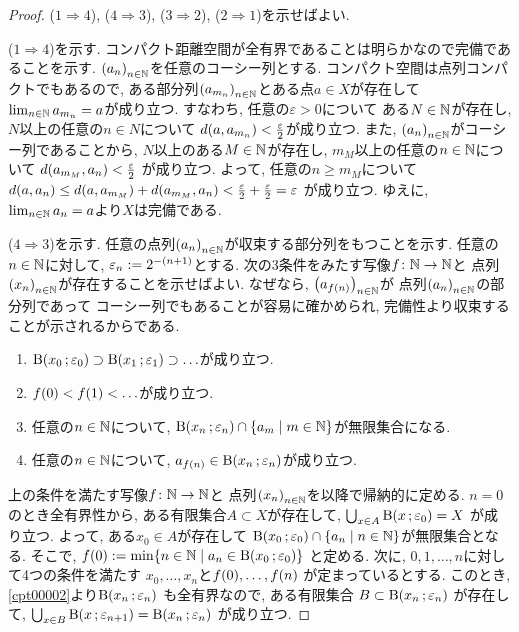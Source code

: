 \documentclass[uplatex, dvipdfmx, a4paper, 12pt, class=jsbook, crop=false]{standalone}
\begin{document}
\begin{proof}
	(\(1 \Longrightarrow 4\)), (\(4 \Longrightarrow 3\)),
	(\(3 \Longrightarrow 2\)), (\(2 \Longrightarrow 1\))を示せばよい.

	(\(1 \Longrightarrow 4\))を示す.
	コンパクト距離空間が全有界であることは明らかなので完備であることを示す.
	\( \lrparen{a_n}_{n \in \N} \)を任意のコーシー列とする.
	コンパクト空間は点列コンパクトでもあるので,
	ある部分列\( \lrparen{a_{m_n}}_{n \in \N} \)とある点\( a \in X \)が存在して
	\( \lim_{n \in \mathbb{N}} a_{m_n} = a \)が成り立つ.
	すなわち, 任意の\( \varepsilon > 0 \)について
	ある\( N \in \mathbb{N} \)が存在し,
	\( N \)以上の任意の\( n \in N \)について
	\( d\lrparen{a, a_{m_n}} < \frac{\varepsilon}{2} \)が成り立つ.
	また, \( \lrparen{a_n}_{n \in \N} \)がコーシー列であることから,
	\( N \)以上のある\( M \in \mathbb{N} \)が存在し,
	\( m_M \)以上の任意の\( n \in \mathbb{N} \)について
	\( d\lrparen{a_{m_M}, a_n} < \frac{\varepsilon}{2} \)
	が成り立つ.
	よって, 任意の\( n \geq m_M \)について
	\( d\lrparen{a, a_n} \leq
	d\lrparen{a, a_{m_M}} + d\lrparen{a_{m_M}, a_n}
	< \frac{\varepsilon}{2} + \frac{\varepsilon}{2} = \varepsilon \)
	が成り立つ.
	ゆえに, \( \lim_{n \in \mathbb{N}} a_{n} = a \)より\( X \)は完備である.

	(\(4 \Longrightarrow 3\))を示す.
	任意の点列\( \lrparen{a_n}_{n \in \N} \)が収束する部分列をもつことを示す.
	任意の\( n \in \mathbb{N} \)に対して,
	\( \varepsilon_n \mathrel{:=} 2^{-(n+1)} \)とする.
	次の3条件をみたす写像\( f\colon\mathbb{N}\to\mathbb{N} \)と
	点列\( \lrparen{x_n}_{n \in \N} \)が存在することを示せばよい.
	なぜなら, \( \lrparen{a_{\mappt{f}{n}}}_{n \in \N} \)が
	点列\( \lrparen{a_n}_{n \in \N} \)の部分列であって
	コーシー列でもあることが容易に確かめられ,
	完備性より収束することが示されるからである.
	\begin{enumerate}
		\item \( \topball{x_0}{\varepsilon_0} \supset
		\topball{x_1}{\varepsilon_1} \supset \ldots \)が成り立つ.
		\item \( \mappt{f}{0} < \mappt{f}{1} < \ldots \)が成り立つ.
		\item 任意の\( n \in \mathbb{N} \)について,
		\( \topball{x_n}{\varepsilon_n} \cap
		\setcomp{a_m}{m \in \N} \)が無限集合になる.
		\item 任意の\( n \in \mathbb{N} \)について,
		\( a_{\mappt{f}{n}} \in \topball{x_n}{\varepsilon_n} \)が成り立つ.
	\end{enumerate}
	上の条件を満たす写像\( f\colon\mathbb{N}\to\mathbb{N} \)と
	点列\( \lrparen{x_n}_{n \in \N} \)を以降で帰納的に定める.
	\( n = 0 \)のとき全有界性から,
	ある有限集合\( A \subset X \)が存在して,
	\( \bigcup_{x \in A} \topball{x}{\varepsilon_0} = X \)
	が成り立つ.
	よって, ある\( x_0 \in A \)が存在して
	\( \topball{x_0}{\varepsilon_0} \cap
	\setcomp{a_n}{n \in \N} \)が無限集合となる.
	そこで, \( \mappt{f}{0} \defeq
	\min \setcomp{n \in \N}{a_n \in \topball{x_0}{\varepsilon_0}} \)
	と定める.
	次に, \( 0, 1, \ldots, n \)に対して4つの条件を満たす
	\( x_0, \ldots, x_n \)と\( \mappt{f}{0}, \ldots, \mappt{f}{n} \)
	が定まっているとする.
	このとき, \cref{cpt00002}より\( \topball{x_n}{\varepsilon_n} \)
	も全有界なので, ある有限集合
	\( B \subset \topball{x_n}{\varepsilon_n} \)
	が存在して,
	\( \bigcup_{x \in B} \topball{x}{\varepsilon_{n+1}}
	= \topball{x_n}{\varepsilon_n} \)
	が成り立つ.
	


\end{proof}
\end{document}
